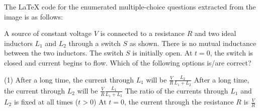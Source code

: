 The LaTeX code for the enumerated multiple-choice questions extracted from the image is as follows:


    \item A source of constant voltage \( V \) is connected to a resistance \( R \) and two ideal inductors \( L_1 \) and \( L_2 \) through a switch \( S \) as shown. There is no mutual inductance between the two inductors. The switch \( S \) is initially open. At \( t = 0 \), the switch is closed and current begins to flow. Which of the following options is/are correct?
        \begin{center}
        \end{center}
        \begin{tasks}(1)
            \task After a long time, the current through \( L_1 \) will be \( \frac{V}{R} \frac{L_2}{L_1+L_2} \)
            \task After a long time, the current through \( L_2 \) will be \( \frac{V}{R} \frac{L_1}{L_1+L_2} \)
            \task The ratio of the currents through \( L_1 \) and \( L_2 \) is fixed at all times (\( t > 0 \))
            \task At \( t = 0 \), the current through the resistance \( R \) is \( \frac{V}{R} \)
        \end{tasks}

